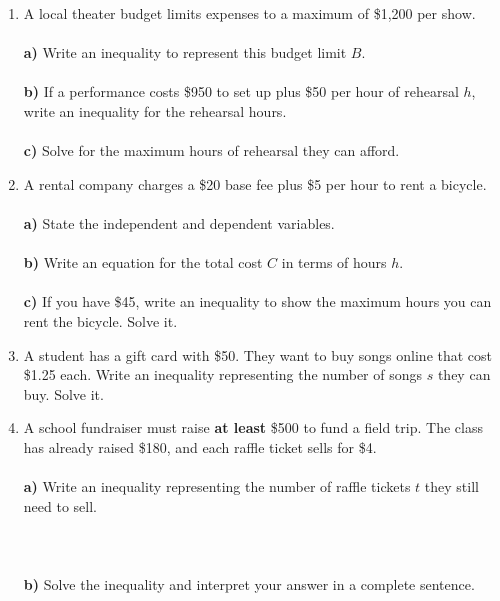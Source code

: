 \documentclass[12pt, letterpaper, fleqn]{article}
\newcommand{\blanklong}{\underline{\hspace{6.5cm}}}
\begin{document}
\begin{enumerate}[itemsep=1.5cm, leftmargin=0.6cm]

\item A local theater budget limits expenses to a maximum of \$1,200 per show. \\ \\
\textbf{a)} Write an inequality to represent this budget limit $B$. \blanklong \\ \\
\textbf{b)} If a performance costs \$950 to set up plus \$50 per hour of rehearsal $h$, write an inequality for the rehearsal hours. \blanklong \\ \\
\textbf{c)} Solve for the maximum hours of rehearsal they can afford.

\vspace{1cm}

\item A rental company charges a \$20 base fee plus \$5 per hour to rent a bicycle. \\ \\
\textbf{a)} State the independent and dependent variables. \blanklong \\ \\
\textbf{b)} Write an equation for the total cost $C$ in terms of hours $h$. \blanklong \\ \\
\textbf{c)} If you have \$45, write an inequality to show the maximum hours you can rent the bicycle. Solve it.

\vspace{2cm}

\item A student has a gift card with \$50. They want to buy songs online that cost \$1.25 each. Write an inequality representing the number of songs $s$ they can buy. Solve it.

\vspace{2cm}

\item A school fundraiser must raise \textbf{at least} \$500 to fund a field trip. The class has already raised \$180, and each raffle ticket sells for \$4. \\ \\
\textbf{a)} Write an inequality representing the number of raffle tickets $t$ they still need to sell. \\ \\ \blanklong \\ \\
\textbf{b)} Solve the inequality and interpret your answer in a complete sentence.


\end{enumerate}
\end{document}
